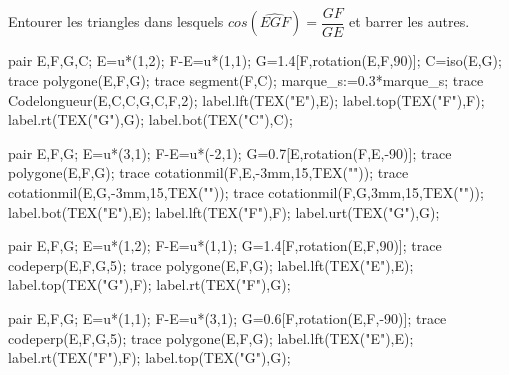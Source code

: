 \begin{exercice*}
    Entourer les triangles dans lesquels \mbox{$cos(\widehat{EGF})=\dfrac{GF}{GE}$} et barrer les autres.
    
    \begin{minipage}{0.45\linewidth}
        \begin{Geometrie}
            pair E,F,G,C;
            E=u*(1,2);
            F-E=u*(1,1);            
            G=1.4[F,rotation(E,F,90)];
            C=iso(E,G);            
            trace polygone(E,F,G);
            trace segment(F,C);
            marque_s:=0.3*marque_s;
            trace Codelongueur(E,C,C,G,C,F,2);
            label.lft(TEX("E"),E);
            label.top(TEX("F"),F);
            label.rt(TEX("G"),G);
            label.bot(TEX("C"),C);
        \end{Geometrie}

        \bigskip
        \begin{Geometrie}
            pair E,F,G;
            E=u*(3,1);
            F-E=u*(-2,1);            
            G=0.7[E,rotation(F,E,-90)];            
            trace polygone(E,F,G);            
            trace cotationmil(F,E,-3mm,15,TEX(""));
            trace cotationmil(E,G,-3mm,15,TEX(""));
            trace cotationmil(F,G,3mm,15,TEX(""));
            label.bot(TEX("E"),E);
            label.lft(TEX("F"),F);
            label.urt(TEX("G"),G);
        \end{Geometrie}
    \end{minipage}
    \hfill
    \begin{minipage}{0.45\linewidth}
        \begin{Geometrie}
            pair E,F,G;
            E=u*(1,2);
            F-E=u*(1,1);            
            G=1.4[F,rotation(E,F,90)];
            trace codeperp(E,F,G,5);
            trace polygone(E,F,G);
            label.lft(TEX("E"),E);
            label.top(TEX("G"),F);
            label.rt(TEX("F"),G);
        \end{Geometrie}

        \bigskip
        \begin{Geometrie}
            pair E,F,G;
            E=u*(1,1);
            F-E=u*(3,1);            
            G=0.6[F,rotation(E,F,-90)];
            trace codeperp(E,F,G,5);
            trace polygone(E,F,G);
            label.lft(TEX("E"),E);
            label.rt(TEX("F"),F);
            label.top(TEX("G"),G);
        \end{Geometrie}
    \end{minipage}
\end{exercice*}
